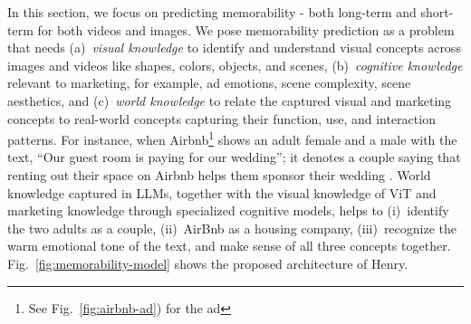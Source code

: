 In this section, we focus on predicting memorability - both long-term and short-term for both videos and images. We pose memorability prediction as a problem that needs (a)~\textit{visual knowledge} to identify and understand visual concepts across images and videos like shapes, colors, objects, and scenes, (b)~\textit{cognitive knowledge} relevant to marketing, for example, ad emotions, scene complexity, scene aesthetics, and (c)~\textit{world knowledge} to relate the captured visual and marketing concepts to real-world concepts capturing their function, use, and interaction patterns. %
For instance, when Airbnb\footnote{See Fig.~\ref{fig:airbnb-ad}) for the ad} shows an adult female and a male with the text, ``Our guest room is paying for our wedding''; it denotes a couple saying that renting out their space on Airbnb helps them sponsor their wedding \cite{kumar2023persuasion}. World knowledge captured in LLMs, together with the visual knowledge of ViT and marketing knowledge through specialized cognitive models, helps to (i)~identify the two adults as a couple, (ii)~AirBnb as a housing company, (iii)~recognize the warm emotional tone of the text, and make sense of all three concepts together. Fig.~\ref{fig:memorability-model} shows the proposed architecture of Henry. %







